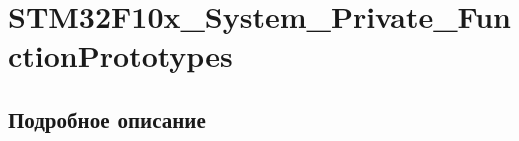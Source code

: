 \hypertarget{group___s_t_m32_f10x___system___private___function_prototypes}{}\section{S\+T\+M32\+F10x\+\_\+\+System\+\_\+\+Private\+\_\+\+Function\+Prototypes}
\label{group___s_t_m32_f10x___system___private___function_prototypes}


\subsection{Подробное описание}
